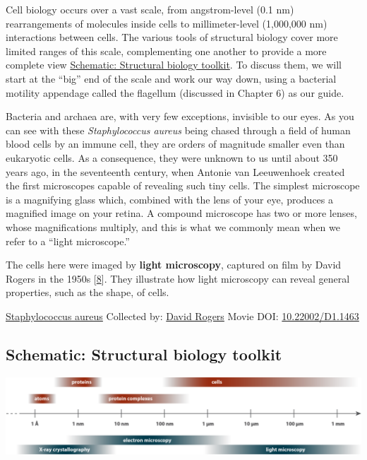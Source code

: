 \documentclass[]{tufte-book}
\begin{document}
Cell biology occurs over a vast scale, from angstrom-level (0.1 nm) rearrangements of molecules inside cells to millimeter-level (1,000,000 nm) interactions between cells. The various tools of structural biology cover more limited ranges of this scale, complementing one another to provide a more complete view \protect\hyperlink{Structural_biology_toolkit}{Schematic: Structural biology toolkit}. To discuss them, we will start at the ``big'' end of the scale and work our way down, using a bacterial motility appendage called the flagellum (discussed in Chapter 6) as our guide.

Bacteria and archaea are, with very few exceptions, invisible to our eyes. As you can see with these \emph{Staphylococcus aureus} being chased through a field of human blood cells by an immune cell, they are orders of magnitude smaller even than eukaryotic cells. As a consequence, they were unknown to us until about 350 years ago, in the seventeenth century, when Antonie van Leeuwenhoek created the first microscopes capable of revealing such tiny cells. The simplest microscope is a magnifying glass which, combined with the lens of your eye, produces a magnified image on your retina. A compound microscope has two or more lenses, whose magnifications multiply, and this is what we commonly mean when we refer to a ``light microscope.''

The cells here were imaged by \textbf{light microscopy}, captured on film by David Rogers in the 1950s {[}\protect\hyperlink{ref-hillInternet}{8}{]}. They illustrate how light microscopy can reveal general properties, such as the shape, of cells.



\hypertarget{htmlwidget-c3a95063b617771d69e0}{}

\label{fig:1-1}\protect\hyperlink{tree}{Staphylococcus aureus} Collected by: \protect\hyperlink{david_rogers}{David Rogers} Movie DOI: \href{https://doi.org/10.22002/D1.1463}{10.22002/D1.1463}

\hypertarget{Structural_biology_toolkit}{%
\subsection*{Schematic: Structural biology toolkit}\label{Structural_biology_toolkit}}

\includegraphics[width=38.54in]{img/schematics/1_1_1}
\end{document}
